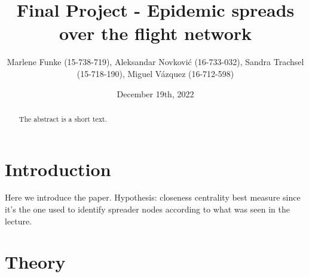 \documentclass{Template resources/netsci-project}
\begin{document}
\title{Final Project - Epidemic spreads over the flight network}
\author{Marlene Funke (15-738-719), Aleksandar Novković (16-733-032), Sandra Trachsel (15-718-190), Miguel Vázquez (16-712-598)}
\date{December 19th, 2022}
\maketitle


\begin{abstract}
The abstract is a short text.
\end{abstract}


\section{Introduction}
Here we introduce the paper. 
Hypothesis: closeness centrality best measure since it's the one used to identify spreader nodes according to what was seen in the lecture.


\section{Theory}
\end{document}
